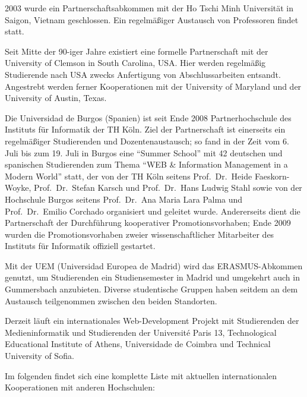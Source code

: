 2003 wurde ein Partnerschaftsabkommen mit der Ho Tschi Minh Universität
in Saigon, Vietnam geschlossen. Ein regelmäßiger Austausch von
Professoren findet statt.

Seit Mitte der 90-iger Jahre existiert eine formelle Partnerschaft mit
der University of Clemson in South Carolina, USA. Hier werden regelmäßig
Studierende nach USA zwecks Anfertigung von Abschlussarbeiten entsandt.
Angestrebt werden ferner Kooperationen mit der University of Maryland
und der University of Austin, Texas.

Die Universidad de Burgos (Spanien) ist seit Ende 2008 Partnerhochschule
des Instituts für Informatik der TH Köln. Ziel der Partnerschaft ist
einerseits ein regelmäßiger Studierenden und Dozentenaustausch; so fand
in der Zeit vom 6. Juli bis zum 19. Juli in Burgos eine ``Summer
School'' mit 42 deutschen und spanischen Studierenden zum Thema ``WEB \&
Information Management in a Modern World'' statt, der von der TH Köln
seitens Prof.~Dr.~Heide Faeskorn-Woyke, Prof.~Dr.~Stefan Karsch und
Prof.~Dr.~Hans Ludwig Stahl sowie von der Hochschule Burgos seitens
Prof.~Dr.~Ana Maria Lara Palma und Prof.~Dr.~Emilio Corchado organisiert
und geleitet wurde. Andererseits dient die Partnerschaft der
Durchführung kooperativer Promotionsvorhaben; Ende 2009 wurden die
Promotionsvorhaben zweier wissenschaftlicher Mitarbeiter des Instituts
für Informatik offiziell gestartet.

Mit der UEM (Universidad Europea de Madrid) wird das ERASMUS-Abkommen
genutzt, um Studierenden ein Studiensemester in Madrid und umgekehrt
auch in Gummersbach anzubieten. Diverse studentische Gruppen haben
seitdem an dem Austausch teilgenommen zwischen den beiden Standorten.

Derzeit läuft ein internationales Web-Development Projekt mit
Studierenden der Medieninformatik und Studierenden der Université Paris
13, Technological Educational Institute of Athens, Universidade de
Coimbra und Technical University of Sofia.

Im folgenden findet sich eine komplette Liste mit aktuellen
internationalen Kooperationen mit anderen Hochschulen:

